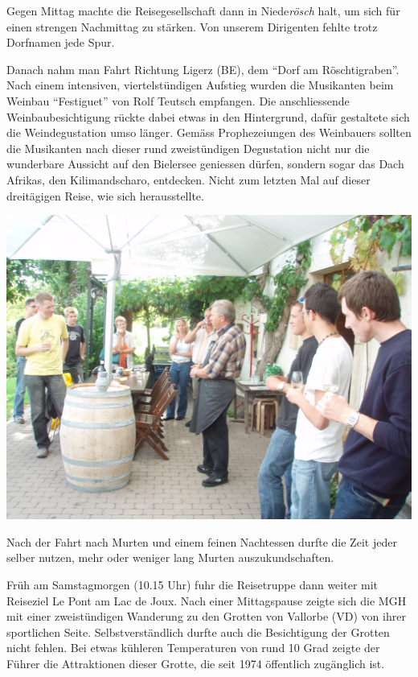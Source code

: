 \begin{history}
    Gegen Mittag machte die Reisegesellschaft dann in Niede\emph{rösch} halt, um
    sich für einen strengen Nachmittag zu stärken. Von unserem Dirigenten fehlte
    trotz Dorfnamen jede Spur.

    Danach nahm man Fahrt Richtung Ligerz (BE), dem \enquote{Dorf am
        Röschtigraben}. Nach einem intensiven, viertelstündigen Aufstieg wurden
    die Musikanten beim Weinbau \enquote{Festiguet} von Rolf Teutsch
    empfangen. Die anschliessende Weinbaubesichtigung rückte dabei etwas in
    den Hintergrund, dafür gestaltete sich die Weindegustation umso länger.
    Gemäss Prophezeiungen des Weinbauers sollten die Musikanten nach dieser
    rund zweistündigen Degustation nicht nur die wunderbare Aussicht auf den
    Bielersee geniessen dürfen, sondern sogar das Dach Afrikas, den
    Kilimandscharo, entdecken. Nicht zum letzten Mal auf dieser dreitägigen
    Reise, wie sich herausstellte.

    \begin{MulticolFigure}
        \centering
        \includegraphics[width=0.93\linewidth]{./chap/2001-2024/2007/Weindegu.JPG}
    \end{MulticolFigure}


    Nach der Fahrt nach Murten und einem feinen Nachtessen durfte die Zeit jeder
    selber nutzen, mehr oder weniger lang Murten auszukundschaften.

    Früh am Samstagmorgen (10.15 Uhr) fuhr die Reisetruppe dann weiter mit
    Reiseziel Le Pont am Lac de Joux. Nach einer Mittagspause zeigte sich die
    MGH mit einer zweistündigen Wanderung zu den Grotten von Vallorbe (VD) von
    ihrer sportlichen Seite. Selbstverständlich durfte auch die Besichtigung der
    Grotten nicht fehlen. Bei etwas kühleren Temperaturen von rund 10 Grad
    zeigte der Führer die Attraktionen dieser Grotte, die seit 1974 öffentlich
    zugänglich ist.


\end{history}
